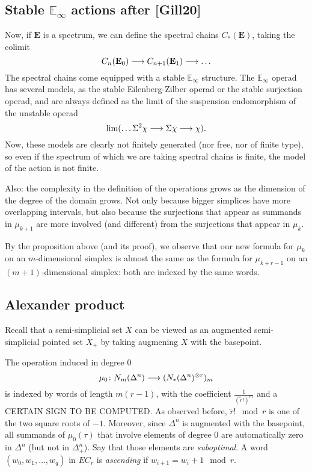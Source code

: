 \subsection{Stable $\mathbb{E}_\infty$ actions after [Gill20]} Now, if $\mathbf{E}$ is a spectrum, we can define the spectral chains $C_*(\mathbf{E})$, taking the colimit
\[C_n(\mathbf{E}_0)\longrightarrow C_{n+1}(\mathbf{E}_1)\longrightarrow \ldots\]
The spectral chains come equipped with a stable $\mathbb{E}_\infty$ structure. The $\mathbb{E}_\infty$ operad has several models, as the stable Eilenberg-Zilber operad or the stable surjection operad, and are always defined as the limit of the suspension endomorphism of the unstable operad
\[\lim(\ldots \Sigma^2 \chi \longrightarrow \Sigma \chi\longrightarrow \chi).\]
Now, these models are clearly not finitely generated (nor free, nor of finite type), so even if the spectrum of which we are taking spectral chains is finite, the model of the action is not finite.

Also: the complexity in the definition of the operations grows as the dimension of the degree of the domain grows. Not only because bigger simplices have more overlapping intervals, but also because the surjections that appear as summands in $\mu_{k+1}$ are more involved (and different) from the surjections that appear in $\mu_k$. 

By the proposition above (and its proof), we observe that our new formula for $\mu_k$ on an $m$-dimensional simplex is almost the same as the formula for $\mu_{k+r-1}$ on an $(m+1)$-dimensional simplex: both are indexed by the same words. 

\subsection{Alexander product} Recall that a semi-simplicial set $X$ can be viewed as an augmented semi-simplicial pointed set $X_+$ by taking augmening $X$ with the basepoint. 

The operation induced in degree $0$
\[\mu_0\colon N_m(\Delta^n)\longrightarrow (N_*(\Delta^n)^{\otimes r})_m\]
is indexed by words of length $m(r-1)$, with the coefficient $\frac{1}{(\tilde{r}!)^m}$ and a CERTAIN SIGN TO BE COMPUTED. As observed before, $\tilde{r}!\mod r$ is one of the two square roots of $-1$. Moreover, since $\Delta^n$ is augmented with the basepoint, all summands of $\mu_0(\tau)$ that involve elements of degree $0$ are automatically zero in $\Delta^n$ (but not in $\Delta^n_+$). Say that those elements are \emph{suboptimal}. A word $(w_0,w_1,\ldots,w_q)$ in $EC_r$ is \emph{ascending} if $w_{i+1} = w_i+1\mod r$. 

